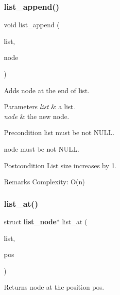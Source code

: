 \subsubsection{list\+\_\+append()}
{\footnotesize\ttfamily void list\+\_\+append (\begin{DoxyParamCaption}\item[{struct \textbf{ list} $\ast$}]{list,  }\item[{struct \textbf{ list\+\_\+node} $\ast$}]{node }\end{DoxyParamCaption})\hspace{0.3cm}{\ttfamily [inline]}}

Adds {\ttfamily node} at the end of {\ttfamily list}.


\begin{DoxyParams}{Parameters}
{\em list} & a list. \\
\hline
{\em node} & the new node.\\
\hline
\end{DoxyParams}
\begin{DoxyPrecond}{Precondition}
{\ttfamily list} must be not N\+U\+LL. 

{\ttfamily node} must be not N\+U\+LL.
\end{DoxyPrecond}
\begin{DoxyPostcond}{Postcondition}
List size increases by 1.
\end{DoxyPostcond}
\begin{DoxyRemark}{Remarks}
Complexity\+: O(n) 
\end{DoxyRemark}
\mbox{\label{list_8c_abcf02e7a58093a7b70a84be889da4aad}} 
\subsubsection{list\+\_\+at()}
{\footnotesize\ttfamily struct \textbf{ list\+\_\+node}$\ast$ list\+\_\+at (\begin{DoxyParamCaption}\item[{const struct \textbf{ list} $\ast$}]{list,  }\item[{size\+\_\+t}]{pos }\end{DoxyParamCaption})}

Returns node at the position {\ttfamily pos}.


